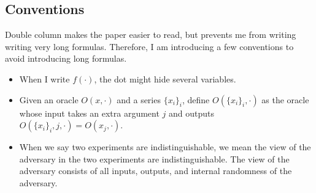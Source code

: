\subsection{Conventions}
Double column makes the paper easier to read, but prevents me from writing writing very long formulas. Therefore, I am introducing a few conventions to avoid introducing long formulas.
\begin{itemize}
    \item When I write $f(\cdot)$, the dot might hide several variables.
    
    \item Given an oracle $O(x, \cdot)$ and a series $\{x_i\}_i$, define $O(\{x_i\}_i, \cdot)$ as the oracle whose input takes an extra argument $j$ and outputs $O(\{x_i\}_i, j, \cdot) = O(x_j, \cdot)$.

    \item When we say two experiments are indistinguishable, we mean the view of the adversary in the two experiments are indistinguishable. The view of the adversary consists of all inputs, outputs, and internal randomness of the adversary.
\end{itemize}
